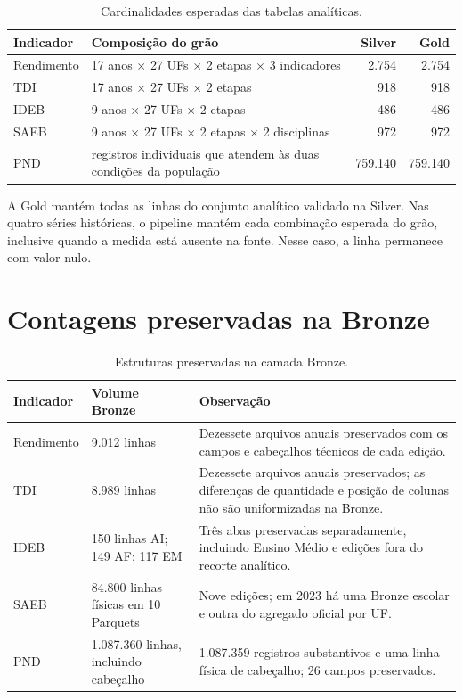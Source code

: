 \begin{table}[H]
\centering
\scriptsize
\caption{Cardinalidades esperadas das tabelas analíticas.}
\label{tab:ap-cardinalidades}
\renewcommand{\arraystretch}{1.15}
\begin{tabular}{|p{3.3cm}|p{6.5cm}|r|r|}
\hline
\textbf{Indicador} & \textbf{Composição do grão} & \textbf{Silver} & \textbf{Gold} \\ \hline
Rendimento & 17 anos $\times$ 27 UFs $\times$ 2 etapas $\times$ 3 indicadores & 2.754 & 2.754 \\ \hline
TDI & 17 anos $\times$ 27 UFs $\times$ 2 etapas & 918 & 918 \\ \hline
IDEB & 9 anos $\times$ 27 UFs $\times$ 2 etapas & 486 & 486 \\ \hline
SAEB & 9 anos $\times$ 27 UFs $\times$ 2 etapas $\times$ 2 disciplinas & 972 & 972 \\ \hline
PND & registros individuais que atendem às duas condições da população & 759.140 & 759.140 \\ \hline
\end{tabular}
\end{table}

A Gold mantém todas as linhas do conjunto analítico validado na Silver. Nas quatro séries históricas, o pipeline mantém cada combinação esperada do grão, inclusive quando a medida está ausente na fonte. Nesse caso, a linha permanece com valor nulo.

\section{Contagens preservadas na Bronze}

\begin{table}[H]
\centering
\scriptsize
\caption{Estruturas preservadas na camada Bronze.}
\label{tab:ap-bronze-contagens}
\renewcommand{\arraystretch}{1.15}
\begin{tabular}{|p{3.0cm}|p{4.0cm}|p{7.2cm}|}
\hline
\textbf{Indicador} & \textbf{Volume Bronze} & \textbf{Observação} \\ \hline
Rendimento & 9.012 linhas & Dezessete arquivos anuais preservados com os campos e cabeçalhos técnicos de cada edição. \\ \hline
TDI & 8.989 linhas & Dezessete arquivos anuais preservados; as diferenças de quantidade e posição de colunas não são uniformizadas na Bronze. \\ \hline
IDEB & 150 linhas AI; 149 AF; 117 EM & Três abas preservadas separadamente, incluindo Ensino Médio e edições fora do recorte analítico. \\ \hline
SAEB & 84.800 linhas físicas em 10 Parquets & Nove edições; em 2023 há uma Bronze escolar e outra do agregado oficial por UF. \\ \hline
PND & 1.087.360 linhas, incluindo cabeçalho & 1.087.359 registros substantivos e uma linha física de cabeçalho; 26 campos preservados. \\ \hline
\end{tabular}
\end{table}

